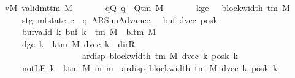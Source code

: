 \begin{isabellebody}
\ \ \ vM{\isacharcolon}{\kern0pt}\ {\isachardoublequoteopen}valid{\isacharunderscore}{\kern0pt}mttm\ M{\isachardoublequoteclose}\isanewline
\ \ \ \ \ \ \ qQ{\isacharcolon}{\kern0pt}\ {\isachardoublequoteopen}q\ {\isasymin}\ Q{\isacharunderscore}{\kern0pt}tm\ M{\isachardoublequoteclose}\isanewline
\ \ \ \ \ \ \ kge{}{\isacharcolon}{\kern0pt}\ {\isachardoublequoteopen}{}\ {\isasymle}\ block{\isacharunderscore}{\kern0pt}width\ {\isacharparenleft}{\kern0pt}{\isasymGamma}{\isacharunderscore}{\kern0pt}tm\ M{\isacharparenright}{\kern0pt}{\isachardoublequoteclose}\isanewline
\ \ \ \ \ \ \ stg{}{\isacharcolon}{\kern0pt}\ {\isachardoublequoteopen}mt{\isacharunderscore}{\kern0pt}state\ c{}\ {\isacharequal}{\kern0pt}\ {\isacharparenleft}{\kern0pt}q{\isacharcomma}{\kern0pt}\ AR{\isacharunderscore}{\kern0pt}SimAdvance{\isacharcomma}{\kern0pt}\ {}{\isacharcomma}{\kern0pt}\ {}{\isacharcomma}{\kern0pt}\ buf{}{\isacharcomma}{\kern0pt}\ dvec{\isacharcomma}{\kern0pt}\ posk{}{\isacharparenright}{\kern0pt}{\isachardoublequoteclose}\isanewline
\ \ \ \ \ \ \ buf{\isacharunderscore}{\kern0pt}valid{\isacharcolon}{\kern0pt}\ {\isachardoublequoteopen}{\isasymforall}k{\isachardot}{\kern0pt}\ buf{}\ k\ {\isasymin}\ {\isasymGamma}{\isacharunderscore}{\kern0pt}tm\ M\ {\isasymunion}\ {\isacharbraceleft}{\kern0pt}bl{\isacharunderscore}{\kern0pt}tm\ M{\isacharbraceright}{\kern0pt}{\isachardoublequoteclose}\isanewline
\ \ \ \ \ \ \ dge{}{\isacharcolon}{\kern0pt}\ {\isachardoublequoteopen}{\isasymforall}k\ {\isacharless}{\kern0pt}\ k{\isacharunderscore}{\kern0pt}tm\ M{\isachardot}{\kern0pt}\ dvec\ k\ {\isasymnoteq}\ dir{\isachardot}{\kern0pt}R\isanewline
\ \ \ \ \ \ \ \ \ \ \ \ \ \ \ \ \ \ {\isasymlongrightarrow}\ {}\ {\isacharless}{\kern0pt}\ ar{\isacharunderscore}{\kern0pt}disp\ {\isacharparenleft}{\kern0pt}block{\isacharunderscore}{\kern0pt}width\ {\isacharparenleft}{\kern0pt}{\isasymGamma}{\isacharunderscore}{\kern0pt}tm\ M{\isacharparenright}{\kern0pt}{\isacharparenright}{\kern0pt}\ {\isacharparenleft}{\kern0pt}dvec\ k{\isacharparenright}{\kern0pt}\ {\isacharparenleft}{\kern0pt}posk{}\ k{\isacharparenright}{\kern0pt}{\isachardoublequoteclose}\isanewline
\ \ \ \ \ \ \ notLE{\isacharcolon}{\kern0pt}\ {\isachardoublequoteopen}{\isasymforall}k\ {\isacharless}{\kern0pt}\ k{\isacharunderscore}{\kern0pt}tm\ M{\isachardot}{\kern0pt}\ {\isasymforall}m{\isachardot}{\kern0pt}\ m\ {\isacharless}{\kern0pt}\ ar{\isacharunderscore}{\kern0pt}disp\ {\isacharparenleft}{\kern0pt}block{\isacharunderscore}{\kern0pt}width\ {\isacharparenleft}{\kern0pt}{\isasymGamma}{\isacharunderscore}{\kern0pt}tm\ M{\isacharparenright}{\kern0pt}{\isacharparenright}{\kern0pt}\ {\isacharparenleft}{\kern0pt}dvec\ k{\isacharparenright}{\kern0pt}\ {\isacharparenleft}{\kern0pt}posk{}\ k{\isacharparenright}{\kern0pt}\isanewline

\end{isabellebody}
